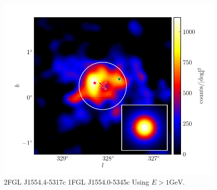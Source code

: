 \documentclass[12pt,preprint]{aastex}
\newcommand{\gev}{\text{GeV}\xspace}
\begin{document}
\begin{figure}
  \begin{center}
    \includegraphics[type=pdf,ext=.pdf,read=.pdf]{source_plots/source_1FGL_J1554.0-5345c}
  \end{center}
  \caption{
2FGL J1554.4-5317c
1FGL J1554.0-5345c
  Using $E>1\gev$. 
  }
  \label{1FGL_J1554.0-5345c}
\end{figure}
\end{document}
